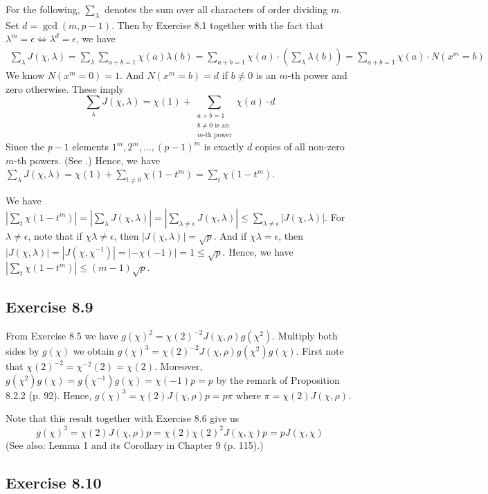 \documentclass[../I&R.tex]{subfiles}
\begin{document}
For the following, $\sum_\lambda$ denotes the sum over all characters of order dividing $m$. Set $d=\gcd(m,p-1)$. Then by Exercise 8.1 together with the fact that $\lambda^m=\epsilon \iff \lambda^d=\epsilon$, we have
\begin{align*}
    \sum_\lambda J(\chi,\lambda) = \sum_\lambda \sum_{a+b=1} \chi(a)\lambda(b) = \sum_{a+b=1} \chi(a)\cdot\left(\sum_\lambda \lambda(b)\right) = \sum_{a+b=1}\chi(a)\cdot N(x^m=b)
\end{align*}
We know $N(x^m=0)=1$. And $N(x^m=b)=d$ if $b\neq0$ is an $m$-th power and zero otherwise. These imply $$\sum_\lambda J(\chi,\lambda) = \chi(1) + \sum_{\substack{a+b=1\\ b\neq0 \text{ is an } \\ m\text{-th power}}} \chi(a)\cdot d$$
Since the $p-1$ elements $1^m,2^m,\ldots,(p-1)^m$ is exactly $d$ copies of all non-zero $m$-th powers. (See .) Hence, we have $\sum_\lambda J(\chi,\lambda) = \chi(1) + \sum_{t\neq0} \chi(1-t^m) = \sum_t \chi(1-t^m)$.

We have $|\sum_t \chi(1-t^m)| = |\sum_\lambda J(\chi,\lambda)| =  |\sum_{\lambda\neq\epsilon} J(\chi,\lambda)| \leq \sum_{\lambda\neq\epsilon} |J(\chi,\lambda)|$. For $\lambda\neq\epsilon$, note that if $\chi\lambda\neq\epsilon$, then $|J(\chi,\lambda)|=\sqrt{p}$. And if $\chi\lambda=\epsilon$, then $|J(\chi,\lambda)| = |J(\chi,\chi^{-1})| = |-\chi(-1)| = 1\leq\sqrt{p}$. Hence, we have $|\sum_t \chi(1-t^m)|\leq (m-1)\sqrt{p}$.

\subsection*{Exercise 8.9}

From Exercise 8.5 we have $g(\chi)^2=\chi(2)^{-2}J(\chi,\rho)g(\chi^2)$. Multiply both sides by $g(\chi)$ we obtain $g(\chi)^3=\chi(2)^{-2}J(\chi,\rho)g(\chi^2)g(\chi)$. First note that $\chi(2)^{-2}=\chi^{-2}(2)=\chi(2)$. Moreover, $g(\chi^2)g(\chi)=g(\chi^{-1})g(\chi)=\chi(-1)p=p$ by the remark of Proposition 8.2.2 (p. 92). Hence, $g(\chi)^3=\chi(2)J(\chi,\rho)p=p\pi$ where $\pi=\chi(2)J(\chi,\rho)$.

Note that this result together with Exercise 8.6 give us $$g(\chi)^3=\chi(2)J(\chi,\rho)p=\chi(2)\chi(2)^2J(\chi,\chi)p=pJ(\chi,\chi)$$
(See also: Lemma 1 and its Corollary in Chapter 9 (p. 115).)

\subsection*{Exercise 8.10}
\end{document}
